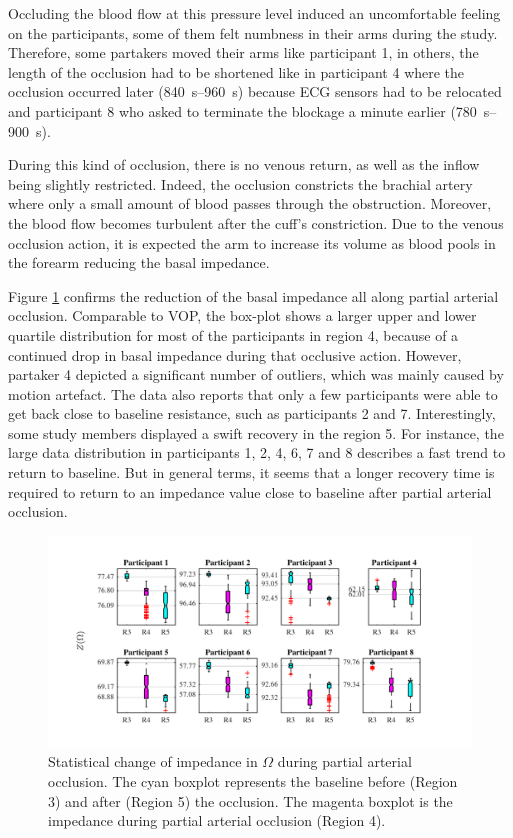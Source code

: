 Occluding the blood flow at this pressure level induced an uncomfortable feeling on the participants, some of them felt numbness in their arms during the study. Therefore, some partakers moved their arms like participant 1, in others, the length of the occlusion had to be shortened like in participant 4 where the occlusion occurred later (\SIrange{840}{960}{\second}) because ECG sensors had to be relocated and participant 8 who asked to terminate the blockage a minute earlier (\SIrange{780}{900}{\second}). 

During this kind of occlusion, there is no venous return, as well as the inflow being slightly restricted. Indeed, the occlusion constricts the brachial artery where only a  small amount of blood passes through the obstruction. Moreover, the blood flow becomes turbulent after the cuff's constriction.  Due to the venous occlusion action, it is expected the arm to increase its volume as blood pools in the forearm reducing the basal impedance. 

Figure \ref{fig:partial arterial statistics impedance} confirms the reduction of the basal impedance all along partial arterial occlusion. Comparable to VOP, the box-plot shows a larger upper and lower quartile distribution for most of the participants in region 4, because of a continued drop in basal impedance during that occlusive action. However, partaker 4 depicted a significant number of outliers, which was mainly caused by motion artefact. The data also reports that only a few participants were able to get back close to baseline resistance, such as participants 2 and 7. Interestingly, some study members displayed a swift recovery in the region 5. For instance, the large data distribution in participants 1, 2, 4, 6, 7 and 8 describes a fast trend to return to baseline. But in general terms, it seems that a longer recovery time is required to return to an impedance value close to baseline after partial arterial occlusion. 

\begin{figure}[htbp]
	\centering
	\includegraphics[width=15cm,keepaspectratio]{figure_vop_4}    
	\caption[Change of impedance during partial arterial occlusion]{Statistical change of impedance in $\Omega$ during partial arterial occlusion. The cyan boxplot represents the baseline before (Region 3) and after (Region 5) the occlusion. The magenta boxplot is the impedance during partial arterial occlusion (Region 4).}
	\label{fig:partial arterial statistics impedance}
\end{figure}  

